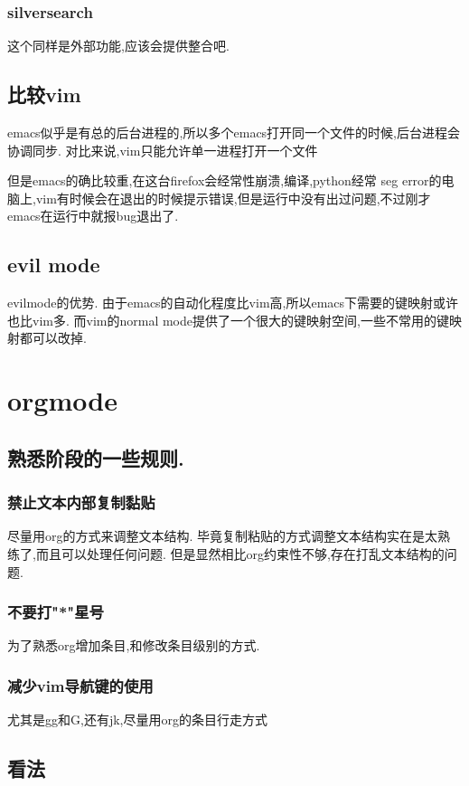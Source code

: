 \documentclass[12pt,a4paper]{article}
\begin{document}
\subsubsection{silversearch}
\label{sec:orgheadline23}
这个同样是外部功能,应该会提供整合吧.
\subsection{比较vim}
\label{sec:orgheadline25}
emacs似乎是有总的后台进程的,所以多个emacs打开同一个文件的时候,后台进程会协调同步.
对比来说,vim只能允许单一进程打开一个文件

但是emacs的确比较重,在这台firefox会经常性崩溃,编译,python经常 seg error的电脑上,vim有时候会在退出的时候提示错误,但是运行中没有出过问题,不过刚才emacs在运行中就报bug退出了.

\subsection{evil mode}
\label{sec:orgheadline26}
evilmode的优势.
由于emacs的自动化程度比vim高,所以emacs下需要的键映射或许也比vim多.
而vim的normal mode提供了一个很大的键映射空间,一些不常用的键映射都可以改掉.
\section{orgmode}
\label{sec:orgheadline43}
\subsection{熟悉阶段的一些规则.}
\label{sec:orgheadline31}
\subsubsection{禁止文本内部复制黏贴}
\label{sec:orgheadline28}
尽量用org的方式来调整文本结构.
毕竟复制粘贴的方式调整文本结构实在是太熟练了,而且可以处理任何问题.
但是显然相比org约束性不够,存在打乱文本结构的问题.
\subsubsection{不要打"*"星号}
\label{sec:orgheadline29}
为了熟悉org增加条目,和修改条目级别的方式.
\subsubsection{减少vim导航键的使用}
\label{sec:orgheadline30}
尤其是gg和G,还有jk,尽量用org的条目行走方式
\subsection{看法}
\label{sec:orgheadline35}
\end{document}
